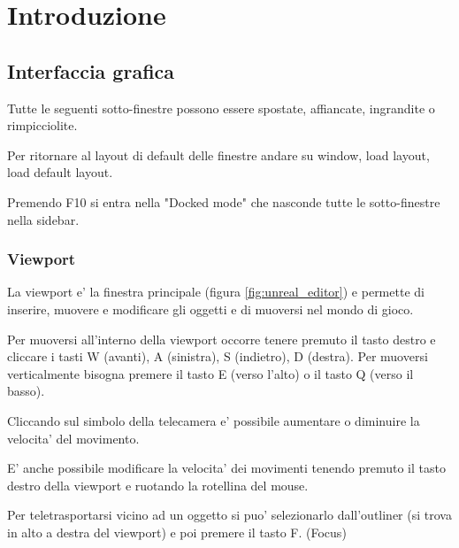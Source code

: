 \chapter{Introduzione}


    \section{Interfaccia grafica}

        \begin{notebox}
            Tutte le seguenti sotto-finestre possono essere spostate, affiancate, ingrandite o rimpicciolite.

            Per ritornare al layout di default delle finestre andare su window, load layout, load default layout.
        \end{notebox}

        \begin{notebox}
            Premendo F10 si entra nella "Docked mode" che nasconde tutte le sotto-finestre nella sidebar.
        \end{notebox}


        \subsection{Viewport}
            La viewport e' la finestra principale (figura \ref{fig:unreal_editor}) e permette di inserire, muovere e modificare gli oggetti e di muoversi nel mondo di gioco.

            Per muoversi all'interno della viewport occorre tenere premuto il tasto destro e cliccare i tasti W (avanti), A (sinistra), S (indietro), D (destra).
            Per muoversi verticalmente bisogna premere il tasto E (verso l'alto) o il tasto Q (verso il basso).

            Cliccando sul simbolo della telecamera \UECameraIcon e' possibile aumentare o diminuire la velocita' del movimento.

            \begin{notebox}
                E' anche possibile modificare la velocita' dei movimenti tenendo premuto il tasto destro della viewport e ruotando la rotellina del mouse.
            \end{notebox}

            Per teletrasportarsi vicino ad un oggetto si puo' selezionarlo dall'outliner (si trova in alto a destra del viewport) e poi premere il tasto F. (Focus)

